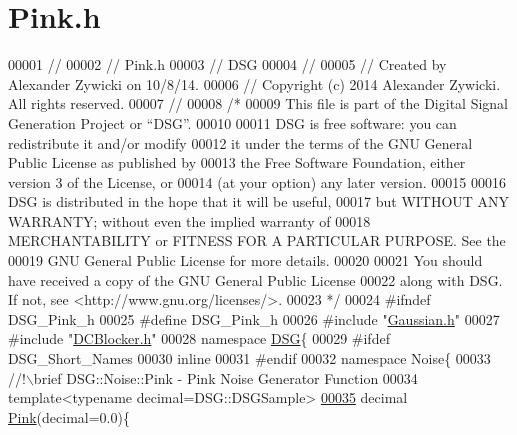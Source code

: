 \hypertarget{_pink_8h_source}{\section{Pink.\+h}
\label{_pink_8h_source}
}

\begin{DoxyCode}
00001 \textcolor{comment}{//}
00002 \textcolor{comment}{//  Pink.h}
00003 \textcolor{comment}{//  DSG}
00004 \textcolor{comment}{//}
00005 \textcolor{comment}{//  Created by Alexander Zywicki on 10/8/14.}
00006 \textcolor{comment}{//  Copyright (c) 2014 Alexander Zywicki. All rights reserved.}
00007 \textcolor{comment}{//}
00008 \textcolor{comment}{/*}
00009 \textcolor{comment}{ This file is part of the Digital Signal Generation Project or “DSG”.}
00010 \textcolor{comment}{}
00011 \textcolor{comment}{ DSG is free software: you can redistribute it and/or modify}
00012 \textcolor{comment}{ it under the terms of the GNU General Public License as published by}
00013 \textcolor{comment}{ the Free Software Foundation, either version 3 of the License, or}
00014 \textcolor{comment}{ (at your option) any later version.}
00015 \textcolor{comment}{}
00016 \textcolor{comment}{ DSG is distributed in the hope that it will be useful,}
00017 \textcolor{comment}{ but WITHOUT ANY WARRANTY; without even the implied warranty of}
00018 \textcolor{comment}{ MERCHANTABILITY or FITNESS FOR A PARTICULAR PURPOSE.  See the}
00019 \textcolor{comment}{ GNU General Public License for more details.}
00020 \textcolor{comment}{}
00021 \textcolor{comment}{ You should have received a copy of the GNU General Public License}
00022 \textcolor{comment}{ along with DSG.  If not, see <http://www.gnu.org/licenses/>.}
00023 \textcolor{comment}{ */}
00024 \textcolor{preprocessor}{#ifndef DSG\_Pink\_h}
00025 \textcolor{preprocessor}{#define DSG\_Pink\_h}
00026 \textcolor{preprocessor}{#include "\hyperlink{_gaussian_8h}{Gaussian.h}"}
00027 \textcolor{preprocessor}{#include "\hyperlink{_d_c_blocker_8h}{DCBlocker.h}"}
00028 \textcolor{keyword}{namespace }\hyperlink{namespace_d_s_g}{DSG}\{
00029 \textcolor{preprocessor}{#ifdef DSG\_Short\_Names}
00030     \textcolor{keyword}{inline}
00031 \textcolor{preprocessor}{#endif}
00032     \textcolor{keyword}{namespace }Noise\{\textcolor{comment}{}
00033 \textcolor{comment}{        //!\(\backslash\)brief DSG::Noise::Pink - Pink Noise Generator Function}
00034 \textcolor{comment}{}        \textcolor{keyword}{template}<\textcolor{keyword}{typename} decimal=DSG::DSGSample>
\hypertarget{_pink_8h_source_l00035}{}\hyperlink{namespace_d_s_g_1_1_noise_a9f0bab677a7602a8e0d40e040de8c8b2}{00035}         decimal \hyperlink{namespace_d_s_g_1_1_noise_a9f0bab677a7602a8e0d40e040de8c8b2}{Pink}(decimal=0.0)\{

\end{DoxyCode}
